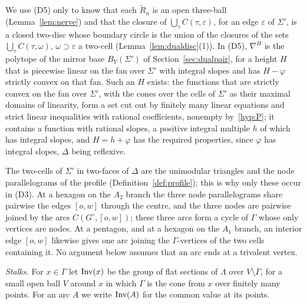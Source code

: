 We use (D5) only to know that each $\widetilde R_n$ is an open three-ball (Lemma~\ref{lem:nerve}) and that the closure of
$\bigcup_\tau C(\tau,\varepsilon)$, for an edge $\varepsilon$ of $\Sigma'$, is a closed two-disc whose boundary circle is the
union of the closures of the sets $\bigcup_\tau C(\tau,\omega)$, $\omega\supset\varepsilon$ a two-cell
(Lemma~\ref{lem:dualdisc}(1)). In (D5), $\nabla^H$ is the polytope of the mirror base $B_Y(\Sigma')$ of
Section~\ref{sec:dualpair}, for a height $H$ that is piecewise linear on the fan over $\Sigma'$ with integral slopes and has
$H-\varphi$ strictly convex on that fan. Such an $H$ exists: the functions that are strictly convex on the fan over $\Sigma'$,
with the cones over the cells of $\Sigma'$ as their maximal domains of linearity, form a set cut out by finitely many linear
equations and strict linear inequalities with rational coefficients, nonempty by~\ref{hyp:P}; it contains a function with
rational slopes, a positive integral multiple $h$ of which has integral slopes, and $H=h+\varphi$ has the required properties,
since $\varphi$ has integral slopes, $\Delta$ being reflexive.

The two-cells of $\Sigma'$ in two-faces of $\Delta$ are the unimodular triangles and the node parallelograms of the
profile (Definition~\ref{def:profile}); this is why only these occur in (D3). At a hexagon on the $A_2$ branch the
three node parallelograms share pairwise the edges $[o,w]$ through the centre, and the three nodes are pairwise
joined by the arcs $C(G^\circ,[o,w])$; these three arcs form a cycle of $\Gamma$ whose only vertices are nodes. At a
pentagon, and at a hexagon on the $A_1$ branch, an interior edge $[o,w]$ likewise gives one arc joining the
$\Gamma$-vertices of the two cells containing it. No argument below assumes that an arc ends at a trivalent vertex.

\emph{Stalks.} For $x\in\Gamma$ let $\operatorname{Inv}(x)$ be the group of flat sections of $\Lambda$ over $V\setminus\Gamma$, for
a small open ball $V$ around $x$ in which $\Gamma$ is the cone from $x$ over finitely many points. For an arc $A$ we
write $\operatorname{Inv}(A)$ for the common value at its points.

